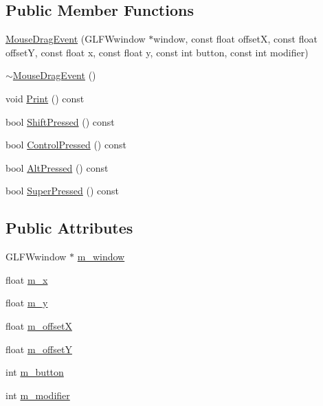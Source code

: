 \subsection*{Public Member Functions}
\begin{DoxyCompactItemize}
\item 
\mbox{\hyperlink{structngl_1_1_mouse_drag_event_a2f477fe2d91013917725fb9dc4839393}{Mouse\+Drag\+Event}} (G\+L\+F\+Wwindow $\ast$window, const float offsetX, const float offsetY, const float x, const float y, const int button, const int modifier)
\item 
\mbox{\hyperlink{structngl_1_1_mouse_drag_event_a00bd00e191749d81752f2391eb819b40}{$\sim$\+Mouse\+Drag\+Event}} ()
\item 
void \mbox{\hyperlink{structngl_1_1_mouse_drag_event_aa387cf1e8dfa68ee6d227f5b4e11fd7a}{Print}} () const
\item 
bool \mbox{\hyperlink{structngl_1_1_mouse_drag_event_a9732ed275ff032886dbb1f611709f51a}{Shift\+Pressed}} () const
\item 
bool \mbox{\hyperlink{structngl_1_1_mouse_drag_event_ac88cfbdafa671169c2f00e4296ffc575}{Control\+Pressed}} () const
\item 
bool \mbox{\hyperlink{structngl_1_1_mouse_drag_event_a7238856f483f3ff98dd4fb88d4dd9364}{Alt\+Pressed}} () const
\item 
bool \mbox{\hyperlink{structngl_1_1_mouse_drag_event_a6762b4dcebe3f585c783a575927a79ff}{Super\+Pressed}} () const
\end{DoxyCompactItemize}
\subsection*{Public Attributes}
\begin{DoxyCompactItemize}
\item 
G\+L\+F\+Wwindow $\ast$ \mbox{\hyperlink{structngl_1_1_mouse_drag_event_a83e3f26e6e80ba31a528e256fa631c59}{m\+\_\+window}}
\item 
float \mbox{\hyperlink{structngl_1_1_mouse_drag_event_aef79a8044c4f54aeddfdf2c09091420a}{m\+\_\+x}}
\item 
float \mbox{\hyperlink{structngl_1_1_mouse_drag_event_aba5b6eb698182f886c4a57c1e06cb29a}{m\+\_\+y}}
\item 
float \mbox{\hyperlink{structngl_1_1_mouse_drag_event_a5625de310815f8e5db249529eb57059b}{m\+\_\+offsetX}}
\item 
float \mbox{\hyperlink{structngl_1_1_mouse_drag_event_a631cbf6f2bdb7f3d424748b6db3cee46}{m\+\_\+offsetY}}
\item 
int \mbox{\hyperlink{structngl_1_1_mouse_drag_event_a49bf9eccc75209a555997dfe3218c7c5}{m\+\_\+button}}
\item 
int \mbox{\hyperlink{structngl_1_1_mouse_drag_event_a6a689f534d659baa3bd9fa604e9c1220}{m\+\_\+modifier}}
\end{DoxyCompactItemize}


